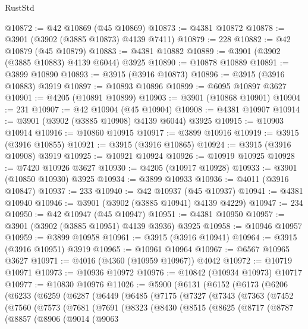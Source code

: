 \begin{lexlean}{RustStd}
\begin{coremodule}
@10872 := @42 @10869 (@45 @10869)
@10873 := @4381 @10872
@10878 := @3901 (@3902 (@3885 @10873) @4139 @7411)
@10879 := 228
@10882 := @42 @10879 (@45 @10879)
@10883 := @4381 @10882
@10889 := @3901 (@3902 (@3885 @10883) @4139 @6044) @3925
@10890 := @10878 @10889
@10891 := @3899 @10890
@10893 := @3915 (@3916 @10873)
@10896 := @3915 (@3916 @10883) @3919
@10897 := @10893 @10896
@10899 := @6095 @10897 @3627
@10901 := @4205 (@10891 @10899)
@10903 := @3901 (@10868 @10901)
@10904 := 231
@10907 := @42 @10904 (@45 @10904)
@10908 := @4381 @10907
@10914 := @3901 (@3902 (@3885 @10908) @4139 @6044) @3925
@10915 := @10903 @10914
@10916 := @10860 @10915
@10917 := @3899 @10916
@10919 := @3915 (@3916 @10855)
@10921 := @3915 (@3916 @10865)
@10924 := @3915 (@3916 @10908) @3919
@10925 := @10921 @10924
@10926 := @10919 @10925
@10928 := @7420 @10926 @3627
@10930 := @4205 (@10917 @10928)
@10933 := @3901 (@10850 @10930) @3925
@10934 := @3899 @10933
@10936 := @4011 (@3916 @10847)
@10937 := 233
@10940 := @42 @10937 (@45 @10937)
@10941 := @4381 @10940
@10946 := @3901 (@3902 (@3885 @10941) @4139 @4229)
@10947 := 234
@10950 := @42 @10947 (@45 @10947)
@10951 := @4381 @10950
@10957 := @3901 (@3902 (@3885 @10951) @4139 @3936) @3925
@10958 := @10946 @10957
@10959 := @3899 @10958
@10961 := @3915 (@3916 @10941)
@10964 := @3915 (@3916 @10951) @3919
@10965 := @10961 @10964
@10967 := @6567 @10965 @3627
@10971 := @4016 (@4360 (@10959 @10967)) @4042
@10972 := @10719 @10971
@10973 := @10936 @10972
@10976 := @10842 (@10934 @10973) @10717
@10977 := @10830 @10976
@11026 := @5900
    (@6131
      (@6152
        (@6173
          (@6206
            (@6233
              (@6259
                (@6287
                  (@6449
                    (@6485
                      (@7175
                        (@7327
                          (@7343
                            (@7363
                              (@7452
                                (@7560
                                  (@7573
                                    (@7681
                                      (@7691
                                        (@8323
                                          (@8430
                                            (@8515
                                              (@8625
                                                (@8717
                                                  (@8787
                                                    (@8857
                                                      (@8906
                                                        (@9014
                                                          (@9063

\end{coremodule}
\end{lexlean}
